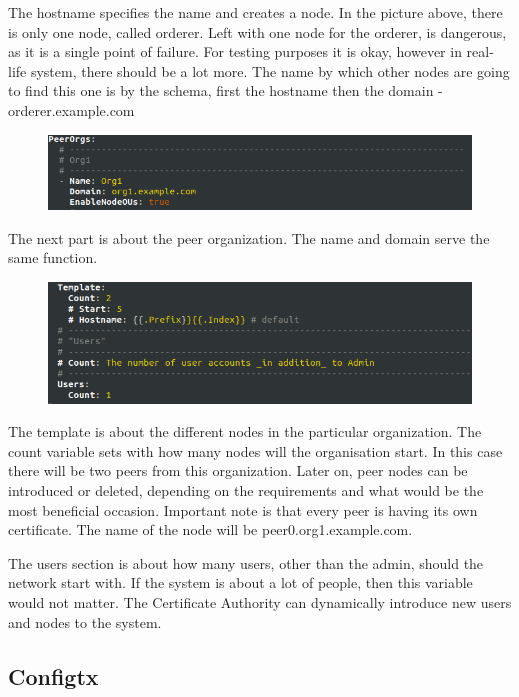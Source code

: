 \documentclass[a4paper,11pt]{report}
\begin{document}
The hostname specifies the name and creates a node. In the picture above, there is only one node, called orderer. Left with one node for the orderer, is dangerous, as it is a single point of failure. For testing purposes it is okay, however in real-life system, there should be a lot more. The name by which other nodes are going to find this one is by the schema, first the hostname then the domain - orderer.example.com

\begin{figure}[h]
\centering
  \includegraphics[width = 16cm]{cryptoconfig2.png}
  \caption{ }
  \label{dockerEnvironment}
\end{figure}

The next part is about the peer organization. The name and domain serve the same function. 

\begin{figure}[h]
\centering
  \includegraphics[width = 16cm]{cryptoconfig3.png}
  \caption{ }
  \label{dockerEnvironment}
\end{figure}

The template is about the different nodes in the particular organization. The count variable sets with how many nodes will the organisation start. In this case there will be two peers from this organization. Later on, peer nodes can be introduced or deleted, depending on the requirements and what would be the most beneficial occasion. Important note is that every peer is having its own certificate. The name of the node will be peer0.org1.example.com. 

The users section is about how many users, other than the admin, should the network start with. If the system is about a lot of people, then this variable would not matter. The Certificate Authority can dynamically introduce new users and nodes to the system. 

\subsection{Configtx}
\end{document}
